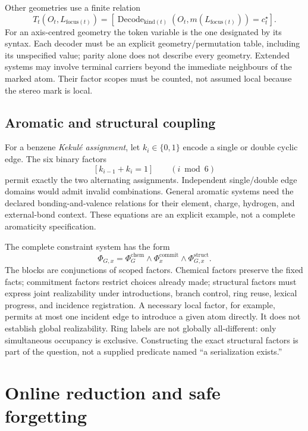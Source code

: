 \documentclass[11pt,a4paper]{article}
\newcommand{\ind}[1]{\left[#1\right]}
\begin{document}
Other geometries use a finite relation
\[
 T_t(O_t,L_{\mathrm{focus}(t)})=
 \ind{\operatorname{Decode}_{\mathrm{kind}(t)}(O_t,m(L_{\mathrm{focus}(t)}))
             =c_t^\star}.
\]
For an axis-centred geometry the token variable is the one designated by its
syntax. Each decoder must be an explicit geometry/permutation table, including
its unspecified value; parity alone does not describe every geometry.
Extended systems may involve terminal carriers beyond the immediate neighbours
of the marked atom. Their factor scopes must be counted, not assumed local
because the stereo mark is local.\cite{note126}

\subsection{Aromatic and structural coupling}
For a benzene \emph{Kekul\'e assignment}, let \(k_i\in\{0,1\}\) encode a single
or double cyclic edge. The six binary factors
\[
 \ind{k_{i-1}+k_i=1}\qquad(i\bmod 6)
\]
permit exactly the two alternating assignments. Independent single/double
edge domains would admit invalid combinations. General aromatic systems need
the declared bonding-and-valence relations for their element, charge, hydrogen,
and external-bond context. These equations are an explicit example, not a
complete aromaticity specification.

The complete constraint system has the form
\begin{equation}\label{eq:blocks}
 \Phi_{G,x}=\Phi_G^{\mathrm{chem}}\land
             \Phi_x^{\mathrm{commit}}\land
             \Phi_{G,x}^{\mathrm{struct}}.
\end{equation}
The blocks are conjunctions of scoped factors. Chemical factors preserve the
fixed facts; commitment factors restrict choices already made; structural
factors must express joint realizability under introductions, branch control,
ring reuse, lexical progress, and incidence registration. A necessary local
factor, for example, permits at most one incident edge to introduce a given
atom directly. It does not establish global realizability. Ring labels are
not globally all-different: only simultaneous occupancy is exclusive.
Constructing the exact structural factors is part of the question, not a supplied
predicate named ``a serialization exists.''\cite{note127}

\section{Online reduction and safe forgetting}
\end{document}
